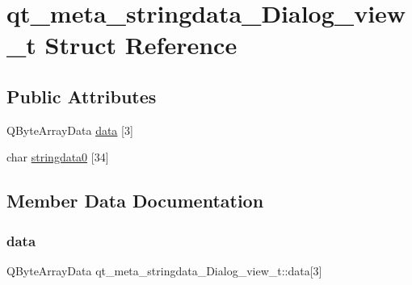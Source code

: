 \hypertarget{structqt__meta__stringdata___dialog__view__t}{}\section{qt\+\_\+meta\+\_\+stringdata\+\_\+\+Dialog\+\_\+view\+\_\+t Struct Reference}
\label{structqt__meta__stringdata___dialog__view__t}
\subsection*{Public Attributes}
\begin{DoxyCompactItemize}
\item 
Q\+Byte\+Array\+Data \hyperlink{structqt__meta__stringdata___dialog__view__t_adce2bfd7d9c5d652c6a42fcefaf98219}{data} \mbox{[}3\mbox{]}
\item 
char \hyperlink{structqt__meta__stringdata___dialog__view__t_a9c929253a0c00e3ba615ee5244832dd9}{stringdata0} \mbox{[}34\mbox{]}
\end{DoxyCompactItemize}


\subsection{Member Data Documentation}
\hypertarget{structqt__meta__stringdata___dialog__view__t_adce2bfd7d9c5d652c6a42fcefaf98219}{}\label{structqt__meta__stringdata___dialog__view__t_adce2bfd7d9c5d652c6a42fcefaf98219} 
\subsubsection{\texorpdfstring{data}{data}}
{\footnotesize\ttfamily Q\+Byte\+Array\+Data qt\+\_\+meta\+\_\+stringdata\+\_\+\+Dialog\+\_\+view\+\_\+t\+::data\mbox{[}3\mbox{]}}

\hypertarget{structqt__meta__stringdata___dialog__view__t_a9c929253a0c00e3ba615ee5244832dd9}{}\label{structqt__meta__stringdata___dialog__view__t_a9c929253a0c00e3ba615ee5244832dd9} 
